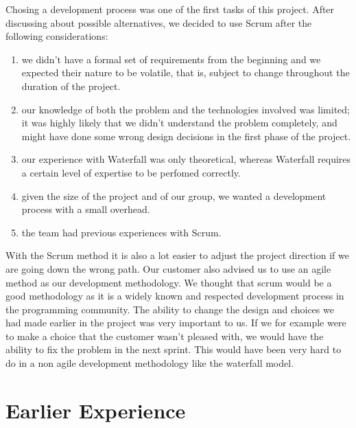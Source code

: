 Chosing a development process was one of the first tasks of this project.
After discussing about possible alternatives, we decided to use Scrum after the following
considerations:

\begin{enumerate}
\item we didn't have a formal set of requirements from the beginning and we expected
their nature to be volatile, that is, subject to change throughout the duration of the project.

\item our knowledge of both the problem and the technologies involved was limited; it was
highly likely that we didn't understand the problem completely, and might have done some wrong
design decisions in the first phase of the project.

\item our experience with Waterfall was only theoretical, whereas Waterfall requires a certain
level of expertise to be perfomed correctly.

\item given the size of the project and of our group, we wanted a development process
with a small overhead.

\item the team had previous experiences with Scrum.

\end{enumerate}

With the Scrum method it is also a lot easier to adjust the project direction if we are going down the wrong path.
Our customer also advised us to use an agile method as our development methodology.
We thought that scrum would be a good methodology as it is a widely known and respected development process in the programming community.
The ability to change the design and choices we had made earlier in the project was very important to us.
If we for example were to make a choice that the customer wasn't pleased with, we would have the ability to fix the problem in the next sprint.
This would have been very hard to do in a non agile development methodology like the waterfall model.


\section{Earlier Experience}
\label{section:earlier-experience}

